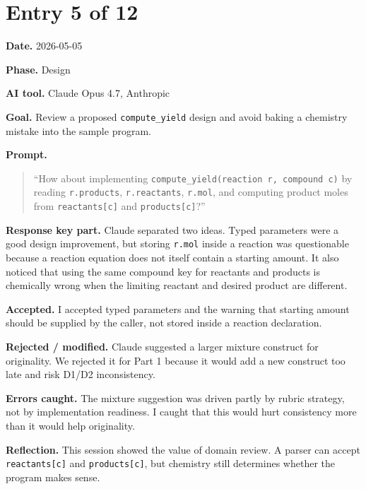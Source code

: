 \documentclass[11pt,a4paper]{article}
\newcommand{\code}[1]{\texttt{#1}}
\newcommand{\field}[2]{\textbf{#1.} #2\par}
\newcommand{\prompt}[1]{%
  \textbf{Prompt.}
  \begin{quote}\small #1\end{quote}
}
\begin{document}
\section{Entry 5 of 12}
\field{Date}{2026-05-05}
\field{Phase}{Design}
\field{AI tool}{Claude Opus 4.7, Anthropic}
\field{Goal}{Review a proposed \code{compute\_yield} design and avoid baking a chemistry mistake into the sample program.}
\prompt{``How about implementing \code{compute\_yield(reaction r, compound c)} by reading \code{r.products}, \code{r.reactants}, \code{r.mol}, and computing product moles from \code{reactants[c]} and \code{products[c]}?''}
\field{Response key part}{Claude separated two ideas. Typed parameters were a good design improvement, but storing \code{r.mol} inside a reaction was questionable because a reaction equation does not itself contain a starting amount. It also noticed that using the same compound key for reactants and products is chemically wrong when the limiting reactant and desired product are different.}
\field{Accepted}{I accepted typed parameters and the warning that starting amount should be supplied by the caller, not stored inside a reaction declaration.}
\field{Rejected / modified}{Claude suggested a larger mixture construct for originality. We rejected it for Part 1 because it would add a new construct too late and risk D1/D2 inconsistency.}
\field{Errors caught}{The mixture suggestion was driven partly by rubric strategy, not by implementation readiness. I caught that this would hurt consistency more than it would help originality.}
\field{Reflection}{This session showed the value of domain review. A parser can accept \code{reactants[c]} and \code{products[c]}, but chemistry still determines whether the program makes sense.}
\end{document}
